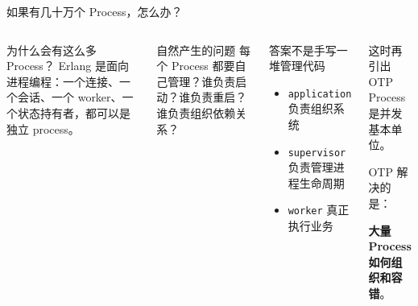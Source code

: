 \documentclass[aspectratio=169, 9pt]{beamer}
\newcommand{\good}[1]{\textbf{\color{accent!80!black}#1}}
\newcommand{\code}[1]{\texttt{#1}}
\begin{document}
\begin{frame}{如果有几十万个 Process，怎么办？}
  \begin{columns}[T,onlytextwidth]
    \begin{alertblock}{为什么会有这么多 Process？}
      Erlang 是面向进程编程：一个连接、一个会话、一个 worker、一个状态持有者，都可以是独立 process。
    \end{alertblock}
    \begin{alertblock}{自然产生的问题}
      每个 Process 都要自己管理？谁负责启动？谁负责重启？谁负责组织依赖关系？
    \end{alertblock}
    \begin{block}{答案不是手写一堆管理代码}
      \begin{itemize}
        \item \code{application} 负责组织系统
        \item \code{supervisor} 负责管理进程生命周期
        \item \code{worker} 真正执行业务
      \end{itemize}
    \end{block}
    \begin{exampleblock}{这时再引出 OTP}
      \centering
      \Large
      Process 是并发基本单位。\par
      OTP 解决的是：\par
      \good{大量 Process 如何组织和容错}。
    \end{exampleblock}
  \end{columns}
\end{frame}
\end{document}
